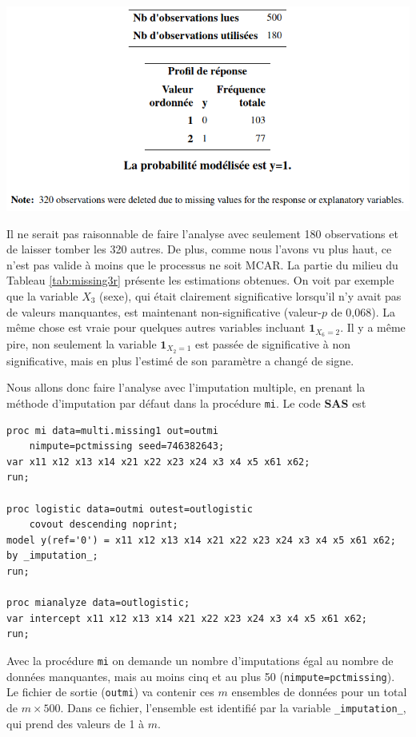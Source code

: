 \documentclass[
  11pt,
  letterpaper,
]{book}
\theoremstyle{definition}
\theoremstyle{definition}
\theoremstyle{definition}
\theoremstyle{remark}
\begin{document}
\begin{center}\includegraphics[width=0.8\linewidth]{figures/06-manquantes-e3} \end{center}

Il ne serait pas raisonnable de faire l'analyse avec seulement 180 observations et de laisser tomber les 320 autres. De plus, comme nous l'avons vu plus haut, ce n'est pas valide à moins que le processus ne soit MCAR. La partie du milieu du Tableau \ref{tab:missing3r} présente les estimations obtenues. On voit par exemple que la variable \(X_3\) (sexe), qui était clairement significative lorsqu'il n'y avait pas de valeurs manquantes, est maintenant non-significative (valeur-\(p\) de 0,068). La même chose est vraie pour quelques autres variables incluant \({\mathbf 1}_{X_6=2}\). Il y a même pire, non seulement la variable \({\mathbf 1}_{X_2=1}\) est passée de significative à non significative, mais en plus l'estimé de son paramètre a changé de signe.

Nous allons donc faire l'analyse avec l'imputation multiple, en prenant la méthode d'imputation par défaut dans la procédure \texttt{mi}. Le code \textbf{SAS} est

\begin{verbatim}
proc mi data=multi.missing1 out=outmi 
    nimpute=pctmissing seed=746382643;
var x11 x12 x13 x14 x21 x22 x23 x24 x3 x4 x5 x61 x62;
run;

proc logistic data=outmi outest=outlogistic 
    covout descending noprint;
model y(ref='0') = x11 x12 x13 x14 x21 x22 x23 x24 x3 x4 x5 x61 x62;
by _imputation_;
run;

proc mianalyze data=outlogistic;
var intercept x11 x12 x13 x14 x21 x22 x23 x24 x3 x4 x5 x61 x62;
run;
\end{verbatim}

Avec la procédure \texttt{mi} on demande un nombre d'imputations égal au nombre de données manquantes, mais au moins cinq et au plus 50 (\texttt{nimpute=pctmissing}). Le fichier de sortie (\texttt{outmi}) va contenir ces \(m\) ensembles de données pour un total de \(m \times 500\). Dans ce fichier, l'ensemble est identifié par la variable \texttt{\_imputation\_}, qui prend des valeurs de 1 à \(m\).
\end{document}
